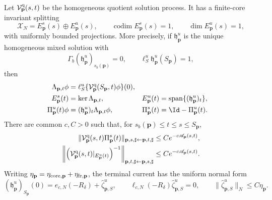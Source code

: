 \begin{theorem}
Let \(\mathcal V_{\mathbf p}^{\rm q}(s,t)\) be the homogeneous quotient
solution process.  It has a finite-core invariant splitting
\begin{equation}
 \mathscr X_N=E_{\mathbf p}^s(s)\oplus E_{\mathbf p}^u(s),
 \qquad \operatorname{codim}E_{\mathbf p}^s(s)=1,
 \qquad \dim E_{\mathbf p}^u(s)=1,             \label{eq:oe-family-core-splitting}
\end{equation}
with uniformly bounded projections.  More precisely, if
\(\mathfrak h_{\mathbf p}^u\) is the unique homogeneous mixed solution
with
\begin{equation}
 \Gamma_b(\mathfrak h_{\mathbf p}^u)_{s_b(\mathbf p)}=0,
 \qquad
 \ell_S^u\mathfrak h_{\mathbf p}^u(S_{\mathbf p})=1,       \label{eq:oe-family-core-unstable-normalization}
\end{equation}
then
\begin{align}
 \Lambda_{\mathbf p,t}\phi
 &=\ell_S^u\{\mathcal V_{\mathbf p}^{\rm q}
        (S_{\mathbf p},t)\phi\}(0),\notag\\
 E_{\mathbf p}^s(t)&=\ker\Lambda_{\mathbf p,t},&
 E_{\mathbf p}^u(t)&=\operatorname{span}
       \{(\mathfrak h_{\mathbf p}^u)_t\},       \label{eq:oe-family-core-bundles}\\
 \Pi_{\mathbf p}^u(t)\phi
 &=(\mathfrak h_{\mathbf p}^u)_t
       \Lambda_{\mathbf p,t}\phi,&
 \Pi_{\mathbf p}^s(t)&=\Id-\Pi_{\mathbf p}^u(t).
                                                        \label{eq:oe-family-core-projections}
\end{align}
There are common \(c,C>0\) such that, for
\(s_b(\mathbf p)\le t\le s\le S_{\mathbf p}\),
\begin{align}
 \|\mathcal V_{\mathbf p}^{\rm q}(s,t)
       \Pi_{\mathbf p}^s(t)\|_{
       \mathbf p,s,\sharp\leftarrow\mathbf p,t,\sharp}
 &\le Ce^{-c\mathscr A_{\mathbf p}(s,t)},\notag\\
 \left\|\left(
  \mathcal V_{\mathbf p}^{\rm q}(s,t)
     |_{E_{\mathbf p}^u(t)}\right)^{-1}\right\|_{
       \mathbf p,t,\sharp\leftarrow\mathbf p,s,\sharp}
 &\le Ce^{-c\mathscr A_{\mathbf p}(s,t)}.       \label{eq:oe-family-core-dichotomy-bounds}
\end{align}
Writing
\(\eta_{\mathbf p}=\eta_{{\rm core},\mathbf p}
 +\eta_{{\rm fr},\mathbf p}\), the terminal current has the uniform
normal form
\begin{equation}
 (\mathfrak h_{\mathbf p}^u)_{S_{\mathbf p}}(0)
 =e_{c,N}(-R_\delta)+\widehat\zeta_{\mathbf p,S}^u,
 \qquad
 \ell_{c,N}(-R_\delta)\widehat\zeta_{\mathbf p,S}^u=0,
 \qquad
 \|\widehat\zeta_{\mathbf p,S}^u\|_N\le C\eta_{\mathbf p}.  \label{eq:oe-family-core-terminal-unstable-current}

\end{equation}
\end{theorem}

